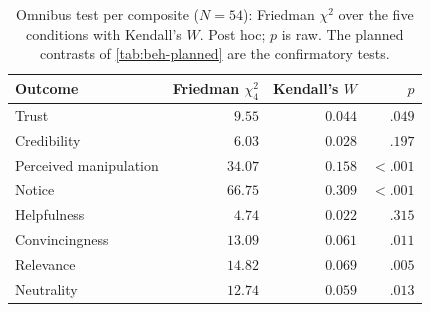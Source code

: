 \begin{table}[H]
\centering
\small
\caption{Omnibus test per composite (\(N=54\)): Friedman \(\chi^2\) over the five conditions with Kendall's \(W\). Post hoc; \(p\) is raw. The planned contrasts of \autoref{tab:beh-planned} are the confirmatory tests.}
\label{tab:beh-friedman}
\begin{tabular}{@{}l r r r@{}}
\toprule
Outcome & Friedman \(\chi^2_4\) & Kendall's \(W\) & \(p\) \\
\midrule
Trust & $9.55$ & $0.044$ & $.049$ \\
Credibility & $6.03$ & $0.028$ & $.197$ \\
Perceived manipulation & $34.07$ & $0.158$ & $<.001$ \\
Notice & $66.75$ & $0.309$ & $<.001$ \\
\midrule
Helpfulness & $4.74$ & $0.022$ & $.315$ \\
Convincingness & $13.09$ & $0.061$ & $.011$ \\
Relevance & $14.82$ & $0.069$ & $.005$ \\
Neutrality & $12.74$ & $0.059$ & $.013$ \\
\bottomrule
\end{tabular}
\end{table}


